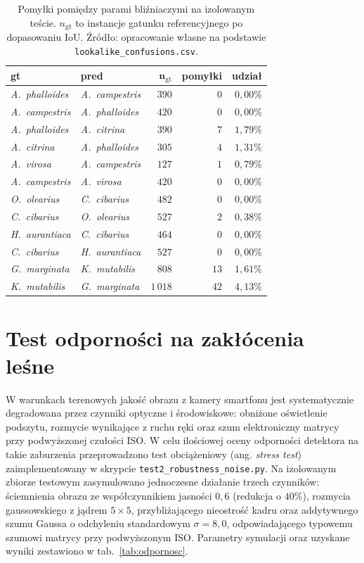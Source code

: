 \begin{table}[htbp]
 \centering
 \caption{Pomyłki pomiędzy parami bliźniaczymi na izolowanym teście. $n_{\mathrm{gt}}$ to instancje gatunku referencyjnego po dopasowaniu IoU. Źródło: opracowanie własne na podstawie \texttt{lookalike\_confusions.csv}.}
 \label{tab:lookalike_pary}
 \begin{tabular}{|p{4.2cm}|p{4.2cm}|r|r|r|}
 \hline
 \textbf{gt} & \textbf{pred} & $\boldsymbol{n_{\mathrm{gt}}}$ & \textbf{pomyłki} & \textbf{udział} \\
 \hline \hline
 \textit{A.\ phalloides} & \textit{A.\ campestris} & $390$ & $0$ & $0{,}00\%$ \\
 \hline
 \textit{A.\ campestris} & \textit{A.\ phalloides} & $420$ & $0$ & $0{,}00\%$ \\
 \hline
 \textit{A.\ phalloides} & \textit{A.\ citrina} & $390$ & $7$ & $1{,}79\%$ \\
 \hline
 \textit{A.\ citrina} & \textit{A.\ phalloides} & $305$ & $4$ & $1{,}31\%$ \\
 \hline
 \textit{A.\ virosa} & \textit{A.\ campestris} & $127$ & $1$ & $0{,}79\%$ \\
 \hline
 \textit{A.\ campestris} & \textit{A.\ virosa} & $420$ & $0$ & $0{,}00\%$ \\
 \hline
 \textit{O.\ olearius} & \textit{C.\ cibarius} & $482$ & $0$ & $0{,}00\%$ \\
 \hline
 \textit{C.\ cibarius} & \textit{O.\ olearius} & $527$ & $2$ & $0{,}38\%$ \\
 \hline
 \textit{H.\ aurantiaca} & \textit{C.\ cibarius} & $464$ & $0$ & $0{,}00\%$ \\
 \hline
 \textit{C.\ cibarius} & \textit{H.\ aurantiaca} & $527$ & $0$ & $0{,}00\%$ \\
 \hline
 \textit{G.\ marginata} & \textit{K.\ mutabilis} & $808$ & $13$ & $1{,}61\%$ \\
 \hline
 \textit{K.\ mutabilis} & \textit{G.\ marginata} & $1\,018$ & $42$ & $4{,}13\%$ \\
 \hline
 \end{tabular}
\end{table}

\section{Test odporności na zakłócenia leśne}
W warunkach terenowych jakość obrazu z kamery smartfonu jest systematycznie degradowana przez czynniki optyczne i środowiskowe: obniżone oświetlenie podszytu, rozmycie wynikające z ruchu ręki oraz szum elektroniczny matrycy przy podwyższonej czułości ISO. W celu ilościowej oceny odporności detektora na takie zaburzenia przeprowadzono test obciążeniowy (ang. \textit{stress test}) zaimplementowany w skrypcie \texttt{test2\_robustness\_noise.py}. Na izolowanym zbiorze testowym zasymulowano jednoczesne działanie trzech czynników: ściemnienia obrazu ze współczynnikiem jasności $0{,}6$ (redukcja o $40\%$), rozmycia gaussowskiego z jądrem $5\times5$, przybliżającego nieostrość kadru oraz addytywnego szumu Gaussa o odchyleniu standardowym $\sigma=8{,}0$, odpowiadającego typowemu szumowi matrycy przy podwyższonym ISO. Parametry symulacji oraz uzyskane wyniki zestawiono w tab.~\ref{tab:odpornosc}.

